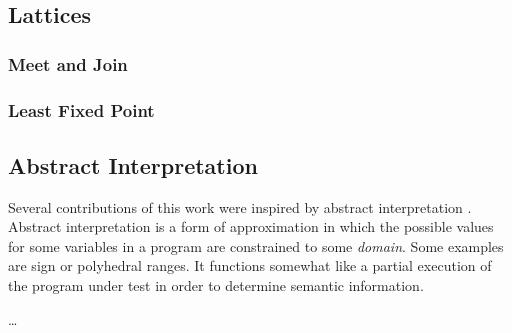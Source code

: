 \subsection{Lattices}\label{lattice-background}

\subsubsection{Meet and Join}

\subsubsection{Least Fixed Point}

\subsection{Abstract Interpretation}\label{background-absint}
Several contributions of this work were inspired by
abstract interpretation \autocite{cousot1976static,cousot1977abstract}
.%
Abstract interpretation is a form of approximation
in which the possible values for some variables in a program
are constrained to some \emph{domain}.
Some examples are sign or polyhedral ranges.
It functions somewhat like a partial execution of the program under test
in order to determine semantic information.

\todo\dots

